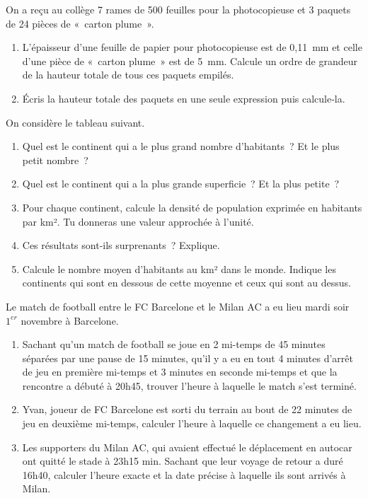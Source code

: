 \begin{exercice}
On a reçu au collège 7 rames de 500 feuilles pour la photocopieuse et 3 paquets de 24 pièces de « carton plume ».
\begin{enumerate}
 \item L'épaisseur d'une feuille de papier pour photocopieuse est de 0,11 mm et celle d'une pièce de « carton plume » est de 5 mm. Calcule un ordre de grandeur de la hauteur totale de tous ces paquets empilés.
 \item Écris la hauteur totale des paquets en une seule expression puis calcule‑la.
 \end{enumerate}
\end{exercice}


\begin{exercice}
On considère le tableau suivant.
\begin{enumerate}
 \item Quel est le continent qui a le plus grand nombre d'habitants ? Et le plus petit nombre ?
 \item Quel est le continent qui a la plus grande superficie ? Et la plus petite ?
 \item Pour chaque continent, calcule la densité de population exprimée en habitants par km². Tu donneras une valeur approchée à l'unité. 
 \item Ces résultats sont‑ils surprenants ? Explique.
 \item Calcule le nombre moyen d'habitants au km² dans le monde. Indique les continents qui sont en dessous de cette moyenne et ceux qui sont au dessus. 
 \end{enumerate}
\end{exercice}


\begin{exercice}[Football]
Le match de football entre le FC Barcelone et le Milan AC a eu lieu mardi soir $1^{er}$ novembre à Barcelone. 
\begin{enumerate}
 \item Sachant qu’un match de football se joue en 2 mi-temps de 45 minutes séparées par une pause de 15 minutes, qu’il y a eu en tout 4 minutes d’arrêt de jeu en première mi-temps et 3 minutes en seconde mi-temps et que la rencontre a débuté à 20h45, trouver l’heure à laquelle le match s’est terminé. 
 \item Yvan, joueur de FC Barcelone est sorti du terrain au bout de 22 minutes de jeu en deuxième mi-temps, calculer l’heure à laquelle ce changement a eu lieu.
 \item Les supporters du Milan AC, qui avaient effectué le déplacement en autocar ont quitté le stade à 23h15 min. Sachant que leur voyage de retour a duré 16h40, calculer l’heure exacte et la date précise à laquelle ils sont arrivés à Milan. 
 \end{enumerate}
\end{exercice}